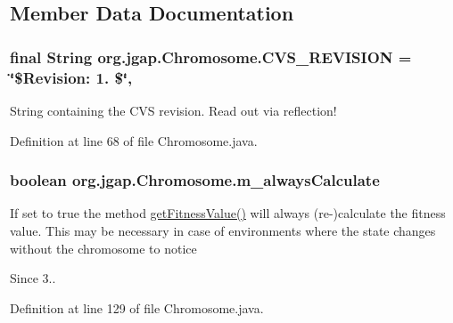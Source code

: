 \subsection{Member Data Documentation}
\hypertarget{classorg_1_1jgap_1_1_chromosome_aa8e104e9bc3f5f2bfdfe67b604c10d9c}{
\subsubsection[{C\-V\-S\-\_\-\-R\-E\-V\-I\-S\-I\-O\-N}]{\setlength{\rightskip}{0pt plus 5cm}final String org.\-jgap.\-Chromosome.\-C\-V\-S\-\_\-\-R\-E\-V\-I\-S\-I\-O\-N = \char`\"{}\$Revision\-: 1. \$\char`\"{}\hspace{0.3cm}{\ttfamily [static]}, {\ttfamily [private]}}}\label{classorg_1_1jgap_1_1_chromosome_aa8e104e9bc3f5f2bfdfe67b604c10d9c}
String containing the C\-V\-S revision. Read out via reflection! 

Definition at line 68 of file Chromosome.\-java.

\hypertarget{classorg_1_1jgap_1_1_chromosome_a678ed92a2a1a47343638de24f40b66e3}{
\subsubsection[{m\-\_\-always\-Calculate}]{\setlength{\rightskip}{0pt plus 5cm}boolean org.\-jgap.\-Chromosome.\-m\-\_\-always\-Calculate\hspace{0.3cm}{\ttfamily [private]}}}\label{classorg_1_1jgap_1_1_chromosome_a678ed92a2a1a47343638de24f40b66e3}
If set to true the method \hyperlink{classorg_1_1jgap_1_1_chromosome_a9ccc6c05aa9c785d1cbae40acc90c80c}{get\-Fitness\-Value()} will always (re-\/)calculate the fitness value. This may be necessary in case of environments where the state changes without the chromosome to notice

\begin{DoxySince}{Since}
3.. 
\end{DoxySince}


Definition at line 129 of file Chromosome.\-java.



